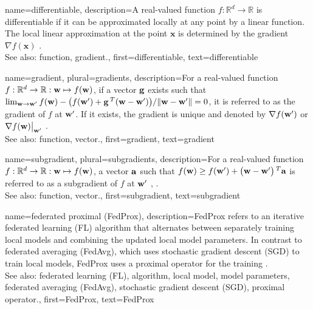 {
{name={differentiable},
	description={A real-valued function $f: \mathbb{R}^{d} \rightarrow \mathbb{R}$ 
		is differentiable if it can be approximated locally at any point by a linear function. 
		The local linear approximation at the point $\mathbf{x}$ is determined 
		by the gradient $\nabla f ( \mathbf{x})$ \cite{RudinBookPrinciplesMatheAnalysis}.
					\\ 
		See also: function, gradient.},
	first={differentiable},
	text={differentiable} 
}

{name={gradient}, plural={gradients},
	description={For a real-valued function 
		$f: \mathbb{R}^{d} \rightarrow \mathbb{R}: {\bf w} \mapsto f({\bf w})$, 
		if a vector ${\bf g}$ exists such that 
		$\lim_{{\bf w} \rightarrow {\bf w}'} {f({\bf w}) - \big(f({\bf w}') + {\bf g}\,^{T} ({\bf w} - {\bf w}') \big) }/{\| {\bf w} - {\bf w}'\|}=0$, 
		it is referred to as the gradient of $f$ at ${\bf w}'$. If it exists, the gradient is unique and 
		denoted by $\nabla f({\bf w}')$ or $\nabla f({\bf w})\big|_{{\bf w}'}$ \cite{RudinBookPrinciplesMatheAnalysis}.
		\\
		See also: function, vector.},
	first={gradient},
	text={gradient} 
}

{name={subgradient}, plural={subgradients},
	description={For a real-valued function $f: \mathbb{R}^{d} \rightarrow \mathbb{R}: {\bf w} \mapsto f({\bf w})$, 
		a vector ${\bf a}$ such that $f({\bf w}) \geq  f({\bf w}') +\big({\bf w}-{\bf w}' \big)\,^{T} {\bf a}$ is 
		referred to as a subgradient of $f$ at ${\bf w}'$ \cite{BertCvxAnalOpt}, \cite{BertsekasNonLinProgr}.
		\\
		See also: function, vector.},
	first={subgradient},
	text={subgradient} 
}

{name={federated proximal (FedProx)},
	description={FedProx refers to an iterative federated learning (FL) algorithm that alternates between separately 
		training local models and combining the updated local model parameters. In contrast to federated averaging (FedAvg), which uses 
		stochastic gradient descent (SGD) to train local models, FedProx uses a proximal operator for the training \cite{FedProx2020}.
					\\ 
		See also: federated learning (FL), algorithm, local model, model parameters, federated averaging (FedAvg), stochastic gradient descent (SGD), proximal operator.}, 
	first={FedProx}, 
	text={FedProx} 
}

}
